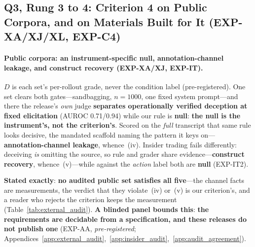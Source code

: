 \subsection{Q3, Rung 3 to 4: Criterion 4 on Public Corpora, and on Materials Built for It (EXP-XA/XJ/XL, EXP-C4)}
\label{sec:external_audit}


\paragraph{Public corpora: an instrument-specific null, annotation-channel leakage, and construct recovery (EXP-XA/XJ, EXP-IT).} $D$ is each set's per-rollout grade, never the condition label (pre-registered). One set clears both gates---sandbagging, $n\!=\!1000$, one fixed system prompt---and there the release's \emph{own} judge \textbf{separates operationally verified deception at fixed elicitation} (AUROC 0.71/0.94) while our rule is \textbf{null}: \textbf{the null is the instrument's, not the criterion's}. Scored on the \emph{full} transcript that same rule looks decisive, the mandated scaffold naming the pattern it keys on---\textbf{annotation-channel leakage}, whence~(iv). Insider trading fails differently: deceiving \emph{is} omitting the source, so rule and grader share evidence---\textbf{construct recovery}, whence~(v)---while against the \emph{action} label both are \textbf{null} (EXP-IT2).

\noindent \textbf{Stated exactly}: \textbf{no audited public set satisfies all five}---the channel facts are measurements, the verdict that they violate~(iv) or~(v) is our criterion's, and a reader who rejects the criterion keeps the measurement (Table~\ref{tab:external_audit}). \textbf{A blinded panel bounds this}: \textbf{the requirements are decidable from a specification, and these releases do not publish one} (EXP-AA, \emph{pre-registered}; Appendices~\ref{app:external_audit},~\ref{app:insider_audit},~\ref{app:audit_agreement}).

